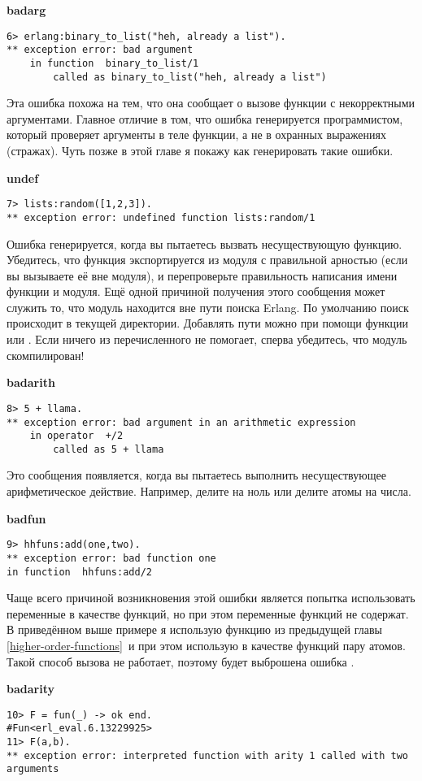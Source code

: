 \textbf{badarg}
\begin{lstlisting}[style=erlang]
6> erlang:binary_to_list("heh, already a list").
** exception error: bad argument
    in function  binary_to_list/1
        called as binary_to_list("heh, already a list")
\end{lstlisting}

Эта ошибка похожа на  тем, что она сообщает о вызове функции с некорректными аргументами. Главное отличие в том, что ошибка генерируется программистом, который проверяет аргументы в теле функции, а не в охранных выражениях (стражах). Чуть позже в этой главе я покажу как генерировать такие ошибки.
\blankline

\textbf{undef}
\begin{lstlisting}[style=erlang]
7> lists:random([1,2,3]).
** exception error: undefined function lists:random/1
\end{lstlisting}
Ошибка генерируется, когда вы пытаетесь вызвать несуществующую функцию. Убедитесь, что функция экспортируется из модуля с правильной арностью (если вы вызываете её вне модуля), и перепроверьте правильность написания имени функции и модуля. Ещё одной причиной получения этого сообщения может служить то, что модуль находится вне пути поиска Erlang. По умолчанию поиск происходит в текущей директории. Добавлять пути можно при помощи функции  или . Если ничего из перечисленного не помогает, сперва убедитесь, что модуль скомпилирован!
\blankline

\textbf{badarith}
\begin{lstlisting}[style=erlang]
8> 5 + llama.
** exception error: bad argument in an arithmetic expression
    in operator  +/2
        called as 5 + llama
\end{lstlisting}

Это сообщения появляется, когда вы пытаетесь выполнить несуществующее арифметическое действие. Например, делите на ноль или делите атомы на числа.
\blankline

\textbf{badfun}
\begin{lstlisting}[style=erlang]
9> hhfuns:add(one,two).
** exception error: bad function one
in function  hhfuns:add/2
\end{lstlisting}
Чаще всего причиной возникновения этой ошибки является попытка использовать переменные в качестве функций, но при этом переменные функций не содержат. В приведённом выше примере я использую функцию  из предыдущей главы \ref{higher-order-functions}~и при этом использую в качестве функций пару атомов. Такой способ вызова не работает, поэтому будет выброшена ошибка .
\blankline

\textbf{badarity}
\begin{lstlisting}[style=erlang]
10> F = fun(_) -> ok end.
#Fun<erl_eval.6.13229925>
11> F(a,b).
** exception error: interpreted function with arity 1 called with two arguments
\end{lstlisting}
